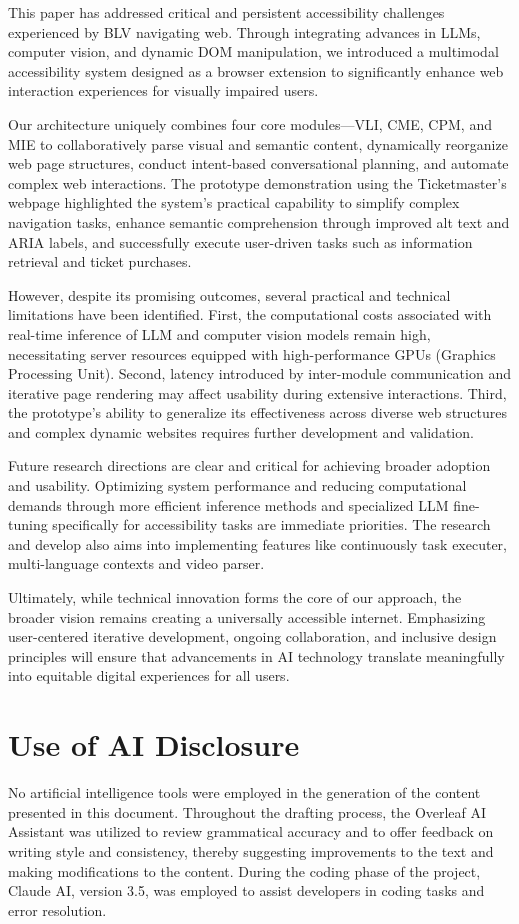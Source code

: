 \documentclass[conference]{IEEEtran}
\begin{document}
This paper has addressed critical and persistent accessibility challenges experienced by BLV navigating web. Through integrating advances in LLMs, computer vision, and dynamic DOM manipulation, we introduced a multimodal accessibility system designed as a browser extension to significantly enhance web interaction experiences for visually impaired users.

Our architecture uniquely combines four core modules—VLI, CME, CPM, and MIE to collaboratively parse visual and semantic content, dynamically reorganize web page structures, conduct intent-based conversational planning, and automate complex web interactions. The prototype demonstration using the Ticketmaster's webpage highlighted the system's practical capability to simplify complex navigation tasks, enhance semantic comprehension through improved alt text and ARIA labels, and successfully execute user-driven tasks such as information retrieval and ticket purchases.

However, despite its promising outcomes, several practical and technical limitations have been identified. First, the computational costs associated with real-time inference of LLM and computer vision models remain high, necessitating server resources equipped with high-performance GPUs (Graphics Processing Unit). Second, latency introduced by inter-module communication and iterative page rendering may affect usability during extensive interactions. Third, the prototype's ability to generalize its effectiveness across diverse web structures and complex dynamic websites requires further development and validation.

Future research directions are clear and critical for achieving broader adoption and usability. Optimizing system performance and reducing computational demands through more efficient inference methods and specialized LLM fine-tuning specifically for accessibility tasks are immediate priorities. The research and develop also aims into implementing features like continuously task executer, multi-language contexts and video parser.

Ultimately, while technical innovation forms the core of our approach, the broader vision remains creating a universally accessible internet. Emphasizing user-centered iterative development, ongoing collaboration, and inclusive design principles will ensure that advancements in AI technology translate meaningfully into equitable digital experiences for all users.


\section{Use of AI Disclosure}\label{ai-disclosure}
No artificial intelligence tools were employed in the generation of the content presented in this document. Throughout the drafting process, the Overleaf AI Assistant was utilized to review grammatical accuracy and to offer feedback on writing style and consistency, thereby suggesting improvements to the text and making modifications to the content. During the coding phase of the project, Claude AI, version 3.5, was employed to assist developers in coding tasks and error resolution.
\end{document}
